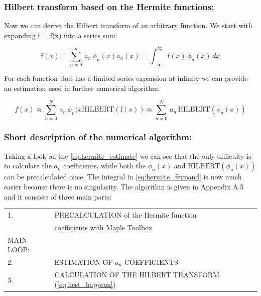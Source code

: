 \documentclass[12pt,twoside,a4paper]{article}
\numberwithin{equation}{subsection}
\numberwithin{figure}{subsection}
\begin{document}
\subsubsection*{Hilbert transform based on the Hermite functions:}

Now we can derive the Hilbert transform of an arbitrary function. We start with expanding f = f(x) into a series sum:

\begin{subequations} \label{eq:hermite_fexpand}
  \begin{equation}   \label{eq:hfe_f}
     \mathrm{f}(x)=\sum_{n=0}^{\infty }\,{a_{n}}\,{\phi_{n}}(x) 
  \end{equation}
  \begin{equation}   \label{eq:hfe_an}
     {a_{n}}(x)=\int_{ - \infty }^{\infty }\mathrm{f}(x)\,{\phi_{n}}(x)\,dx
  \end{equation}
\end{subequations}

For each function that has a limited series expansion at infinity we can provide an estimation used in further numerical algorithm:

\begin{subequations} \label{eq:hermite_estimate}
  \begin{equation}   \label{eq:hest_fapprox}
      f(x) \approx \sum_{n=0}^{N}\,{a_{n}}\,{\phi_{n}}(x
  \end{equation}
  \begin{equation}   \label{eq:hest_happrox}
     \mathrm{HILBERT}(\mathrm{f}(x)) \approx \sum_{n=0}^{N}\,{a_{n}}\,\mathrm{HILBERT}({\phi_{n}}(x))
  \end{equation}
\end{subequations}

\subsubsection*{Short description of the numerical algorithm:}

Taking a look on the \ref{eq:hermite_estimate} we can see that the only difficulty is to calculate the ${a_{n}}$ coefficients,
while both the ${\phi_{n}}(x)$ and $\mathrm{HILBERT}({\phi_{n}}(x))$ can be precalculated once. The integral in
\ref{eq:hermite_fexpand} is now much easier because there is no singularity. The algorithm is given in Appendix A.5 and it
consists of three main parts:


\begin{tabular}{l l}
  1.         & PRECALCULATION of the Hermite function \\
             & coefficients with Maple Toolbox \\
  MAIN LOOP: & \\
  2.         & ESTIMATION OF ${a_{n}}$ COEFFICIENTS \\
  3.         & CALCULATION OF THE HILBERT TRANSFORM (\ref{eq:hest_happrox}) \\
\end{tabular}
\end{document}
